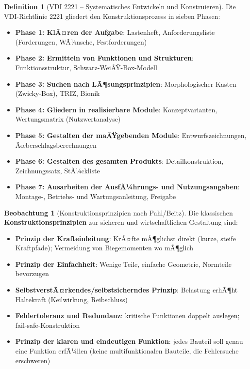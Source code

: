 ﻿\documentclass[a4paper,12pt]{report}
\theoremstyle{definition}
\newtheorem{definition}{Definition}
\newtheorem{beobachtung}{Beobachtung}
\begin{document}
\begin{definition}[VDI 2221 -- Systematisches Entwickeln und Konstruieren]
Die VDI-Richtlinie 2221 gliedert den Konstruktionsprozess in sieben Phasen:
\begin{itemize}
    \item[-] \textbf{Phase 1: KlÃ¤ren der Aufgabe}: Lastenheft, Anforderungsliste
          (Forderungen, WÃ¼nsche, Festforderungen)
    \item[-] \textbf{Phase 2: Ermitteln von Funktionen und Strukturen}:
          Funktionsstruktur, Schwarz-WeiÃŸ-Box-Modell
    \item[-] \textbf{Phase 3: Suchen nach LÃ¶sungsprinzipien}:
          Morphologischer Kasten (Zwicky-Box), TRIZ, Bionik
    \item[-] \textbf{Phase 4: Gliedern in realisierbare Module}:
          Konzeptvarianten, Wertungsmatrix (Nutzwertanalyse)
    \item[-] \textbf{Phase 5: Gestalten der maÃŸgebenden Module}:
          Entwurfszeichnungen, Ãœberschlagsberechnungen
    \item[-] \textbf{Phase 6: Gestalten des gesamten Produkts}:
          Detailkonstruktion, Zeichnungssatz, StÃ¼ckliste
    \item[-] \textbf{Phase 7: Ausarbeiten der AusfÃ¼hrungs- und Nutzungsangaben}:
          Montage-, Betriebs- und Wartungsanleitung, Freigabe
\end{itemize}
\end{definition}

\begin{beobachtung}[Konstruktionsprinzipien nach Pahl/Beitz]
Die klassischen \textbf{Konstruktionsprinzipien} zur sicheren und
wirtschaftlichen Gestaltung sind:
\begin{itemize}
    \item[-] \textbf{Prinzip der Krafteinleitung}: KrÃ¤fte mÃ¶glichst direkt
          (kurze, steife Kraftpfade); Vermeidung von Biegemomenten wo mÃ¶glich
    \item[-] \textbf{Prinzip der Einfachheit}: Wenige Teile, einfache Geometrie,
          Normteile bevorzugen
    \item[-] \textbf{SelbstverstÃ¤rkendes/selbstsicherndes Prinzip}:
          Belastung erhÃ¶ht Haltekraft (Keilwirkung, Reibschluss)
    \item[-] \textbf{Fehlertoleranz und Redundanz}: kritische Funktionen
          doppelt auslegen; fail-safe-Konstruktion
    \item[-] \textbf{Prinzip der klaren und eindeutigen Funktion}:
          jedes Bauteil soll genau eine Funktion erfÃ¼llen
          (keine multifunktionalen Bauteile, die Fehlersuche erschweren)
\end{itemize}
\end{beobachtung}
\end{document}
